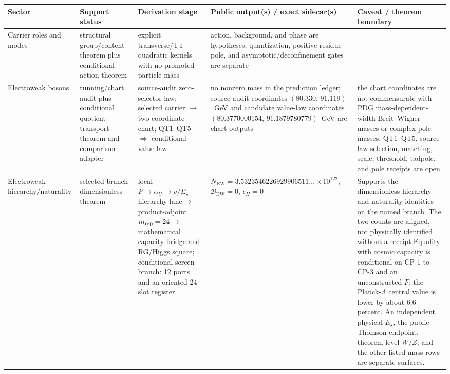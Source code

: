 \documentclass[11pt]{article}
\begin{document}
\begin{table}[h]
\centering
\tiny
\setlength{\tabcolsep}{2pt}
\begin{tabular}{@{}>{\raggedright\arraybackslash}p{}>{\raggedright\arraybackslash}p{}>{\raggedright\arraybackslash}p{}>{\raggedright\arraybackslash}p{}>{\raggedright\arraybackslash}p{}@{}}
\toprule
Sector & Support status & Derivation stage & Public output(s) / exact sidecar(s) & Caveat / theorem boundary \\
\midrule
Carrier roles and modes & structural group/content theorem plus conditional action theorem & explicit transverse/TT quadratic kernels with no promoted particle mass & action, background, and phase are hypotheses; quantization, positive-residue pole, and asymptotic/deconfinement gates are separate \\
Electroweak bosons & running/chart audit plus conditional quotient-transport theorem and comparison adapter & source-audit zero-selector law; selected carrier \(\rightarrow\) two-coordinate chart; QT1--QT5 \(\Rightarrow\) conditional value law & no nonzero mass in the prediction ledger; source-audit coordinates \((80.330,\,91.119)\)~GeV and candidate value-law coordinates \((80.3770000154,\,91.1879780779)\)~GeV are chart outputs & the chart coordinates are not commensurate with PDG mass-dependent-width Breit--Wigner masses or complex-pole masses. QT1--QT5, source-law selection, matching, scale, threshold, tadpole, and pole receipts are open \\
Electroweak hierarchy/naturality & selected-branch dimensionless theorem & local \(P\to\alpha_U\to v/E_\star\) hierarchy lane\newline \(\rightarrow\) product-adjoint \(m_{\rm rep}=24\)\newline \(\rightarrow\) mathematical capacity bridge and RG/Higgs square; conditional screen branch: 12 ports and an oriented 24-slot register & \(N_{\mathrm{EW}}=3.5323546226929906511\ldots\times10^{122}\), \(\mathcal B_{\mathrm{EW}}=0\), \(\epsilon_H=0\) & Supports the dimensionless hierarchy and naturality identities on the named branch. The two counts are aligned, not physically identified without a receipt.\newline Equality with cosmic capacity is conditional on CP-1 to CP-3 and an unconstructed \(F\); the Planck-\(\Lambda\) central value is lower by about \(6.6\) percent. An independent physical \(E_\star\), the public Thomson endpoint, theorem-level \(W/Z\), and the other listed mass rows are separate surfaces. \\

\end{tabular}
\end{table}
\end{document}
